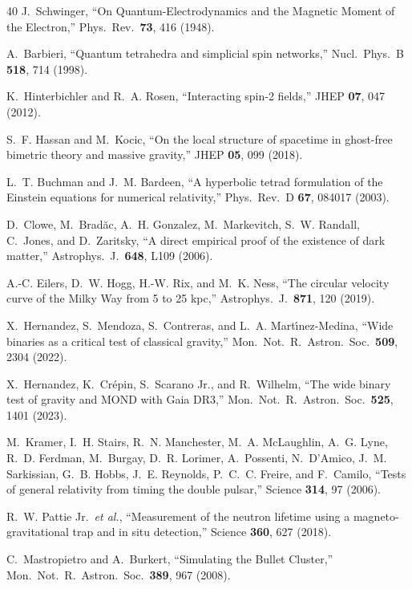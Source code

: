 \documentclass[aps,prd,preprint,superscriptaddress,showpacs,preprintnumbers,amsmath,amssymb,nofootinbib]{revtex4-2}
\begin{document}
\begin{thebibliography}{40}
J.~Schwinger, ``On Quantum-Electrodynamics and the Magnetic Moment of the Electron,'' Phys.\ Rev.\ \textbf{73}, 416 (1948).

A.~Barbieri, ``Quantum tetrahedra and simplicial spin networks,'' Nucl.\ Phys.\ B \textbf{518}, 714 (1998).

K.~Hinterbichler and R.~A. Rosen, ``Interacting spin-2 fields,'' JHEP \textbf{07}, 047 (2012).

S.~F. Hassan and M.~Kocic, ``On the local structure of spacetime in ghost-free bimetric theory and massive gravity,'' JHEP \textbf{05}, 099 (2018).

L.~T. Buchman and J.~M. Bardeen, ``A hyperbolic tetrad formulation of the Einstein equations for numerical relativity,'' Phys.\ Rev.\ D \textbf{67}, 084017 (2003).

D.~Clowe, M.~Brad\u{a}c, A.~H. Gonzalez, M.~Markevitch, S.~W. Randall, C.~Jones, and D.~Zaritsky, ``A direct empirical proof of the existence of dark matter,'' Astrophys.\ J.\ \textbf{648}, L109 (2006).

A.-C. Eilers, D.~W. Hogg, H.-W. Rix, and M.~K. Ness, ``The circular velocity curve of the Milky Way from 5 to 25 kpc,'' Astrophys.\ J.\ \textbf{871}, 120 (2019).

X.~Hernandez, S.~Mendoza, S.~Contreras, and L.~A. Mart\'{\i}nez-Medina, ``Wide binaries as a critical test of classical gravity,'' Mon.\ Not.\ R.\ Astron.\ Soc.\ \textbf{509}, 2304 (2022).

X.~Hernandez, K.~Cr\'epin, S.~Scarano Jr., and R.~Wilhelm, ``The wide binary test of gravity and MOND with Gaia DR3,'' Mon.\ Not.\ R.\ Astron.\ Soc.\ \textbf{525}, 1401 (2023).

M.~Kramer, I.~H. Stairs, R.~N. Manchester, M.~A. McLaughlin, A.~G. Lyne, R.~D. Ferdman, M.~Burgay, D.~R. Lorimer, A.~Possenti, N.~D'Amico, J.~M. Sarkissian, G.~B. Hobbs, J.~E. Reynolds, P.~C.~C. Freire, and F.~Camilo, ``Tests of general relativity from timing the double pulsar,'' Science \textbf{314}, 97 (2006).

R.~W. Pattie Jr.\ \textit{et al.}, ``Measurement of the neutron lifetime using a magneto-gravitational trap and in situ detection,'' Science \textbf{360}, 627 (2018).

C.~Mastropietro and A.~Burkert, ``Simulating the Bullet Cluster,'' Mon.\ Not.\ R.\ Astron.\ Soc.\ \textbf{389}, 967 (2008).


\end{thebibliography}
\end{document}
